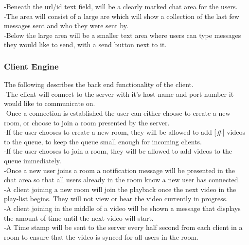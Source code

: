\documentclass{article}
\begin{document}
-Beneath the url/id text field, will be a clearly marked chat area for the users.\\

-The area will consist of a large are which will show a collection of the last few messages sent and who they were sent by.\\

-Below the large area will be a smaller text area where users can type messages they would like to send, with a send button next to it.

\subsubsection{Client Engine}

The following describes the back end functionality of the client.\\

-The client will connect to the server with it's host-name and port number it would like to communicate on.\\

-Once a connection is established the user can either choose to create a new room, or choose to join a room presented by the server.\\

-If the user chooses to create a new room, they will be allowed to add [\textbf{\#}] videos to the queue, to keep the queue small enough for incoming clients.\\

-If the user chooses to join a room, they will be allowed to add videos to the queue immediately.\\

-Once a new user joins a room a notification message will be presented in the chat area so that all users already in the room know a new user has connected.\\

-A client joining a new room will join the playback once the next video in the play-list begins. They will not view or hear the video currently in progress.\\

-A client joining in the middle of a video will be shown a message that displays the amount of time until the next video will start.\\

-A Time stamp will be sent to the server every half second from each client in a room to ensure that the video is synced for all users in the room. \\
\end{document}
